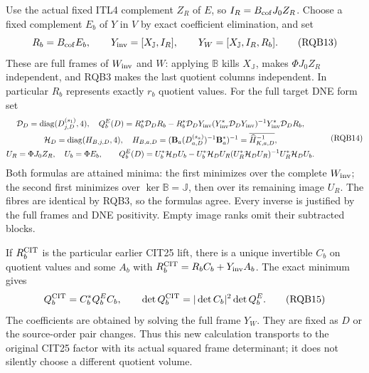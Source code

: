 \documentclass[10pt]{article}
\begin{document}
Use the actual fixed ITL4 complement $Z_R$ of $E$, so
$I_R=B_{\rm cof}J_0Z_R$. Choose a fixed complement $E_b$ of $Y$
in $V$ by exact coefficient elimination, and set
\[
 R_b=B_{\rm cof}E_b,\qquad
 Y_{\rm inv}=[X_{\mathbb J},I_R],\qquad
 Y_W=[X_{\mathbb J},I_R,R_b].
 \tag{RQB13}
\]
These are full frames of $W_{\rm inv}$ and $W$: applying
$\mathbb B$ kills $X_{\mathbb J}$, makes $\Phi J_0Z_R$ independent,
and RQB3 makes the last quotient columns independent.
In particular $R_b$ represents exactly $r_b$ quotient values.
For the full target DNE form set
\[
\begin{gathered}
 \mathcal D_D=\operatorname{diag}(D_{j,D}^{(s_1)},4),\quad
 Q_b^E(D)=R_b^*\mathcal D_D R_b
 -R_b^*\mathcal D_DY_{\rm inv}
       (Y_{\rm inv}^*\mathcal D_DY_{\rm inv})^{-1}
                          Y_{\rm inv}^*\mathcal D_D R_b,\\
 \mathcal H_D=\operatorname{diag}(H_{B,j,D},4),\quad
 H_{B,a,D}=(\mathbf B_a(D_{a,D}^{(s_a)})^{-1}\mathbf B_a^*)^{-1}
                   =\overline{\widehat H_{K,a,D}^{-1}},\\
 U_R=\Phi J_0Z_R,\quad U_b=\Phi E_b,\qquad
 Q_b^E(D)=U_b^*\mathcal H_DU_b
 -U_b^*\mathcal H_DU_R(U_R^*\mathcal H_DU_R)^{-1}
                                      U_R^*\mathcal H_DU_b .
\end{gathered}\tag{RQB14}
\]
Both formulas are attained minima: the first minimizes over the
complete $W_{\rm inv}$; the second first minimizes over
$\ker\mathbb B=\mathbb J$, then over its remaining image $U_R$.
The fibres are identical by RQB3, so the formulas agree.
Every inverse is justified by the full frames and DNE positivity.
Empty image ranks omit their subtracted blocks.

If $R_b^{\rm CIT}$ is the particular earlier CIT25 lift, there is
a unique invertible $C_b$ on quotient values and some $A_b$ with
$R_b^{\rm CIT}=R_b C_b+Y_{\rm inv}A_b$.
The exact minimum gives
\[
 Q_b^{\rm CIT}=C_b^*Q_b^E C_b,\qquad
 \det Q_b^{\rm CIT}=|\det C_b|^2\det Q_b^E .
 \tag{RQB15}
\]
The coefficients are obtained by solving the full frame $Y_W$.
They are fixed as $D$ or the source-order pair changes. Thus this
new calculation transports to the original CIT25 factor with its
actual squared frame determinant; it does not silently choose a
different quotient volume.
\end{document}
